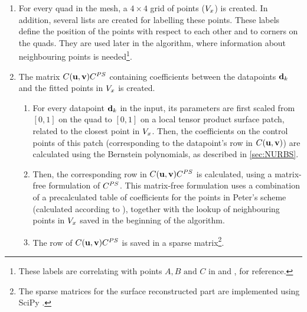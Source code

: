 \begin{enumerate}
\item For every quad in the mesh, a $4 \times 4$ grid of points ($\petersPatchPoints$) is created. In addition, several lists are created for labelling these points. These labels define the position of the points with respect to each other and to corners on the quads. They are used later in the algorithm, where information about neighbouring points is needed\footnote{These labels are correlating with points $A, B \text{ and } C$ in \cite{peters1992constructing} and \cite{eck1996automatic}, for reference.}.
\item The matrix $\lsControlPointCoefMatrix(\vec{u},\vec{v})\lsControlPointCoefMatrix^{PS}$ containing coefficients between the datapoints $\lsDataPoint_k$ and the fitted points in $\petersPatchPoints$ is created.
\begin{enumerate}[label=(\alph*)]
\item For every datapoint $\lsDataPoint_k$ in the input, its parameters are first scaled from $\left[0,1\right]$ on the quad to $\left[0,1\right]$ on a local tensor product \Bez surface patch, related to the closest point in $\petersPatchPoints$. Then, the coefficients on the \Bez control points of this patch (corresponding to the datapoint's row in $\lsControlPointCoefMatrix(\vec{u},\vec{v})$) are calculated using the Bernstein polynomials, as described in \autoref{sec:NURBS}. 
\item Then, the corresponding row in $\lsControlPointCoefMatrix(\vec{u},\vec{v})\lsControlPointCoefMatrix^{PS}$ is calculated, using a matrix-free formulation of $\lsControlPointCoefMatrix^{PS}$. This matrix-free formulation uses a combination of a precalculated table of coefficients for the points in Peter's scheme (calculated according to \cite{eck1996automatic}), together with the lookup of neighbouring points in $\petersPatchPoints$ saved in the beginning of the algorithm. 
\item The row of $\lsControlPointCoefMatrix(\vec{u},\vec{v})\lsControlPointCoefMatrix^{PS}$ is saved in a sparse matrix\footnote{The sparse matrices for the surface reconstructed part are implemented using SciPy \cite{SciPy}.}. 

\end{enumerate}
\end{enumerate}
